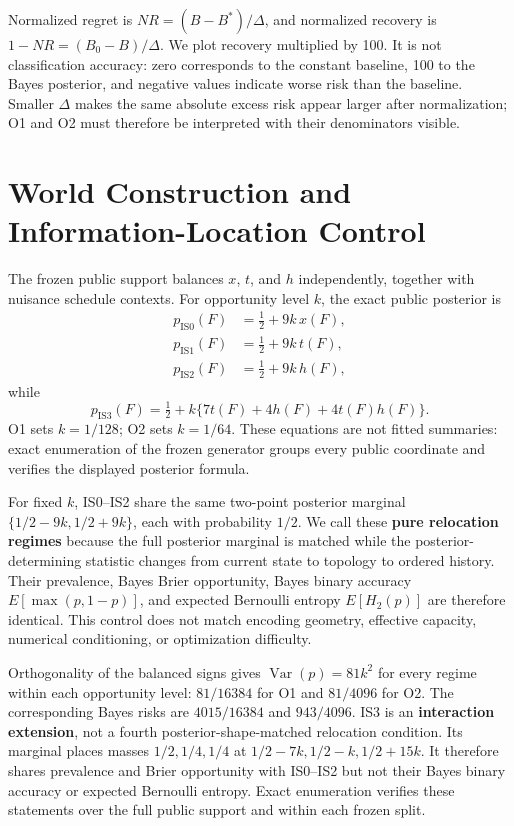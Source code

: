 \documentclass[11pt]{article}
\begin{document}
Normalized regret is $NR=(B-B^*)/\Delta$, and normalized recovery is $1-NR=(B_0-B)/\Delta$. We plot recovery multiplied by 100. It is not classification accuracy: zero corresponds to the constant baseline, 100 to the Bayes posterior, and negative values indicate worse risk than the baseline. Smaller $\Delta$ makes the same absolute excess risk appear larger after normalization; O1 and O2 must therefore be interpreted with their denominators visible.

\section{World Construction and Information-Location Control}

The frozen public support balances $x$, $t$, and $h$ independently, together with nuisance schedule contexts. For opportunity level $k$, the exact public posterior is
\begin{align}
p_{\mathrm{IS0}}(F)&=\tfrac12+9k\,x(F),\\
p_{\mathrm{IS1}}(F)&=\tfrac12+9k\,t(F),\\
p_{\mathrm{IS2}}(F)&=\tfrac12+9k\,h(F),
\end{align}
while
\[
p_{\mathrm{IS3}}(F)=\tfrac12+k\{7t(F)+4h(F)+4t(F)h(F)\}.
\]
O1 sets $k=1/128$; O2 sets $k=1/64$. These equations are not fitted summaries: exact enumeration of the frozen generator groups every public coordinate and verifies the displayed posterior formula.

For fixed $k$, IS0--IS2 share the same two-point posterior marginal $\{1/2-9k,1/2+9k\}$, each with probability $1/2$. We call these \textbf{pure relocation regimes} because the full posterior marginal is matched while the posterior-determining statistic changes from current state to topology to ordered history. Their prevalence, Bayes Brier opportunity, Bayes binary accuracy $E[\max(p,1-p)]$, and expected Bernoulli entropy $E[H_2(p)]$ are therefore identical. This control does not match encoding geometry, effective capacity, numerical conditioning, or optimization difficulty.

Orthogonality of the balanced signs gives $\operatorname{Var}(p)=81k^2$ for every regime within each opportunity level: $81/16384$ for O1 and $81/4096$ for O2. The corresponding Bayes risks are $4015/16384$ and $943/4096$. IS3 is an \textbf{interaction extension}, not a fourth posterior-shape-matched relocation condition. Its marginal places masses $1/2,1/4,1/4$ at $1/2-7k,1/2-k,1/2+15k$. It therefore shares prevalence and Brier opportunity with IS0--IS2 but not their Bayes binary accuracy or expected Bernoulli entropy. Exact enumeration verifies these statements over the full public support and within each frozen split.
\end{document}
